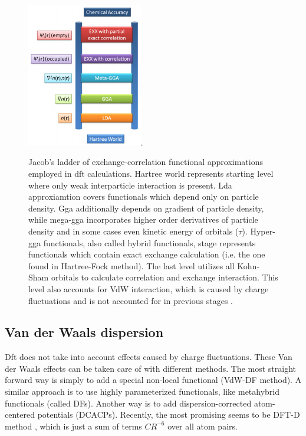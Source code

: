 \documentclass[openany, longbibliography,slovene,a4paper,12pt]{article}
\begin{document}
\begin{figure}
  \centering
  \includegraphics[width=0.45\textwidth]{jacobs_functional_ladder_ver2.png}.
  \caption{Jacob’s ladder of exchange-correlation functional approximations
    employed in dft calculations. Hartree world represents starting level where only
    weak interparticle interaction is present. Lda approxiamtion covers
    functionals which depend only on particle density. Gga additionally depends
    on gradient of particle density, while mega-gga incorporates higher order
    derivatives of particle density and in some cases even kinetic energy of
    orbitals ($\tau$). Hyper-gga functionals, also called hybrid functionals,
    stage represents functionals which contain exact exchange calculation (i.e.
    the one found in Hartree-Fock method). The last level utilizes all Kohn-Sham
    orbitals to calculate correlation and exchange interaction. This level also
    accounts for VdW interaction, which is caused by charge fluctuations and is
    not accounted for in previous stages \cite{How_theo_simul_can_address}.
  }
  \label{bijection}
\end{figure}

\subsection{Van der Waals dispersion}
Dft does not take into account effects caused by charge fluctuations. These Van
der Waals effects can be taken care of with different methods. The most straight
forward way is simply to add a special non-local functional (VdW-DF method). A similar
approach is to use highly parameterized functionals, like metahybrid
functionals (called DFs). Another way is to add dispersion-corrected atom-centered potentials (DCACPs).
Recently, the most promising seems to be DFT-D method
\cite{consis_accur_ab_initio_param}, which is just a sum of terms $CR^{-6}$
over all atom pairs.
\end{document}
